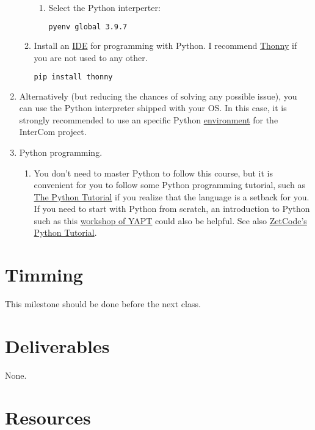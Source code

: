 \begin{enumerate}
\begin{enumerate}
\begin{enumerate}
\item Select the Python interperter:
  \begin{lstlisting}[mathescape=false, language=Bash]
pyenv global 3.9.7
\end{lstlisting}

\end{enumerate}
    
  \item Install an
    \href{https://en.wikipedia.org/wiki/Integrated_development_environment}{IDE}
    for programming with Python. I recommend
    \href{https://thonny.org/}{Thonny} if you are not used to any
    other.
    
    \begin{lstlisting}[language=Bash]
pip install thonny
    \end{lstlisting}

  \end{enumerate}

\item Alternatively (but reducing the chances of solving any possible
  issue), you can use the Python interpreter shipped with your OS. In
  this case, it is strongly recommended to use an specific Python
  \href{https://docs.python.org/3/library/venv.html}{environment} for
  the InterCom project.
  
\item Python programming.
  
  \begin{enumerate}
    
  \item You don't need to master Python to follow this course, but it
    is convenient for you to follow some Python programming tutorial,
    such as \href{https://docs.python.org/3/tutorial/}{The Python
    Tutorial} \cite{python-tutorial} if you realize that the language
    is a setback for you. If you need to start with Python from
    scratch, an introduction to Python such as
    this \href{https://github.com/vicente-gonzalez-ruiz/YAPT/tree/master/workshops/programacion_python_ESO}{workshop
    of YAPT} \cite{YAPT} could also be helpful. See
    also \href{http://zetcode.com/lang/python/}{ZetCode's Python
    Tutorial}.
    
  \end{enumerate}

\end{enumerate}

\section{Timming}

This milestone should be done before the next class.

\section{Deliverables}

None.

\section{Resources}

\renewcommand{\addcontentsline}[3]{}%

